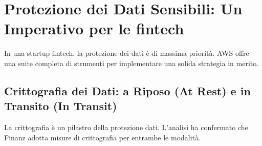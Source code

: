 \section{Protezione dei Dati Sensibili: Un Imperativo per le fintech}
\label{sec:data-protection_cap2}
In una startup fintech, la protezione dei dati è di massima priorità. AWS offre una suite completa di strumenti per implementare una solida strategia in merito.

\subsection{Crittografia dei Dati: a Riposo (At Rest) e in Transito (In Transit)}
\label{subsec:encryption_cap2}
La crittografia è un pilastro della protezione dati. L'analisi ha confermato che Finanz adotta misure di crittografia per entrambe le modalità.
